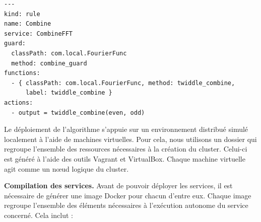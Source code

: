 \begin{lstlisting}[caption={Production du service CombineFFT}, label={lst:combine_pdtion}]
---
kind: rule
name: Combine
service: CombineFFT
guard:
  classPath: com.local.FourierFunc
  method: combine_guard
functions:
  - { classPath: com.local.FourierFunc, method: twiddle_combine,
      label: twiddle_combine }
actions:
  - output = twiddle_combine(even, odd)
\end{lstlisting}

Le déploiement de l’algorithme s’appuie sur un environnement distribué simulé localement à l’aide de machines virtuelles. Pour cela, nous utilisons %
un dossier qui regroupe l’ensemble des ressources nécessaires à la création du cluster. Celui-ci est généré à l’aide des outils Vagrant\cite{hashicorp_vagrant_docs} et VirtualBox\cite{virtualbox}. Chaque machine virtuelle agit comme un nœud logique du cluster.

\textbf{Compilation des services.}
Avant de pouvoir déployer les services, il est nécessaire de générer une image Docker pour chacun d’entre eux. Chaque image regroupe l’ensemble des éléments nécessaires à l’exécution autonome du service concerné. Cela inclut :

